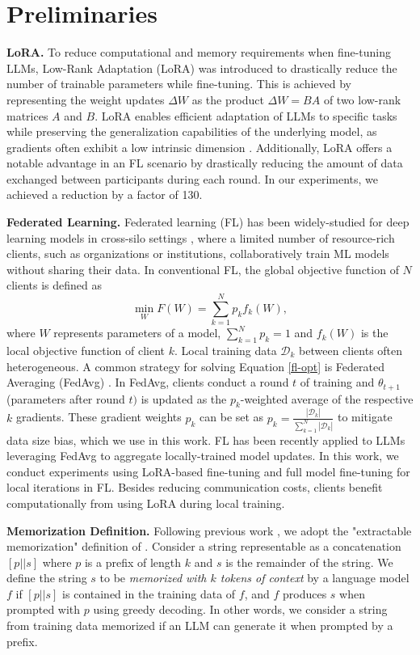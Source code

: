 \section{Preliminaries}
\textbf{LoRA.} To reduce computational and memory requirements when fine-tuning LLMs, Low-Rank Adaptation (LoRA) \citep{hu2021lora} was introduced to drastically reduce the number of trainable parameters while fine-tuning. This is achieved by representing the weight updates $\Delta W$ as the product $\Delta W=BA$ of two low-rank matrices $A$ and $B$. LoRA enables efficient adaptation of LLMs to specific tasks while preserving the generalization capabilities of the underlying model, as gradients often exhibit a low intrinsic dimension \citep{li2018intrinsicdim, aghajanyan2020intrinsicdim}. Additionally, LoRA offers a notable advantage in an FL scenario by drastically reducing the amount of data exchanged between participants during each round. In our experiments, we achieved a reduction by a factor of 130. 

\textbf{Federated Learning.} Federated learning (FL) has been widely-studied for deep learning models in cross-silo settings \cite{huang2022fl}, where a limited number of resource-rich clients, such as organizations or institutions, collaboratively train ML models without sharing their data.
In conventional FL, the global objective function of $N$ clients is defined as
\begin{equation}
\label{fl-opt}
    \min_W F(W) = \sum_{k=1}^N p_k f_k(W),
\end{equation}
where $W$ represents parameters of a model, $\sum_{k=1}^N p_k=1$ and $f_k(W)$ is the local objective function of client $k$. Local training data $\mathcal{D}_k$ between clients often heterogeneous. A common strategy for solving Equation \ref{fl-opt} is Federated Averaging (FedAvg) \citep{mcmahan2016fedavg}. In FedAvg, clients conduct a round $t$ of training and $\theta_{t+1}$ (parameters after round $t)$ is updated as the $p_k$-weighted average of the respective $k$ gradients. These gradient weights $p_k$ can be set as $p_k=\frac{|\mathcal{D}_k|}{\sum_{k=1}^N |\mathcal{D}_k|}$ to mitigate data size bias, which we use in this work. FL has been recently applied to LLMs \cite{ye2024openfedllm, thakkar2020understanding, liu2024differentially, ramaswamy2020training} leveraging FedAvg to aggregate locally-trained model updates. In this work, we conduct experiments using LoRA-based fine-tuning and full model fine-tuning for local iterations in FL. Besides reducing communication costs, clients benefit computationally from using LoRA during local training.

\textbf{Memorization Definition.} Following previous work \citep{ippolito2023verbatim, huang2024demyst, hans2024goldfish}, we adopt the "extractable memorization" definition of \citet{memo}. Consider a string representable as a concatenation $[p||s]$ where $p$ is a prefix of length $k$ and $s$ is the remainder of the string. We define the string $s$ to be \textit{memorized with $k$ tokens of context} by a language model $f$ if $[p||s]$ is contained in the training data of $f$, and $f$ produces $s$ when prompted with $p$ using greedy decoding. In other words, we consider a string from training data memorized if an LLM can generate it when prompted by a prefix. 